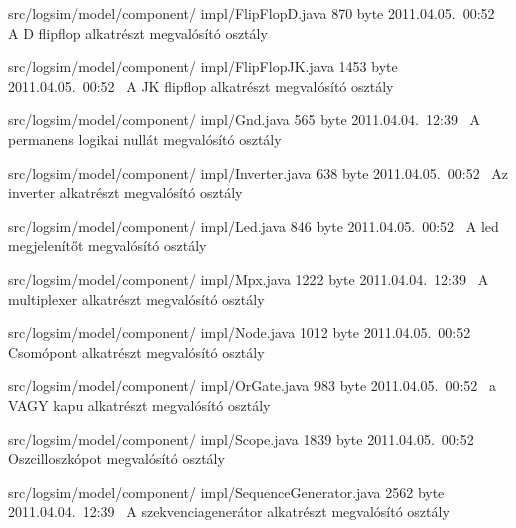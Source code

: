\begin{fajllista}
\fajl
{src/logsim/model/component/\newline
impl/FlipFlopD.java} %
{870 byte} %
{2011.04.05.~00:52~} %
{A D flipflop alkatrészt megvalósító osztály} %

\fajl
{src/logsim/model/component/\newline
impl/FlipFlopJK.java} %
{1453 byte} %
{2011.04.05.~00:52~} %
{A JK flipflop alkatrészt megvalósító osztály} %

\fajl
{src/logsim/model/component/\newline
impl/Gnd.java} %
{565 byte} %
{2011.04.04.~12:39~} %
{A permanens logikai nullát megvalósító osztály} %

\fajl
{src/logsim/model/component/\newline
impl/Inverter.java} %
{638 byte} %
{2011.04.05.~00:52~} %
{Az inverter alkatrészt megvalósító osztály} %

\fajl
{src/logsim/model/component/\newline
impl/Led.java} %
{846 byte} %
{2011.04.05.~00:52~} %
{A led megjelenítőt megvalósító osztály} %

\fajl
{src/logsim/model/component/\newline
impl/Mpx.java} %
{1222 byte} %
{2011.04.04.~12:39~} %
{A multiplexer alkatrészt megvalósító osztály} %

\fajl
{src/logsim/model/component/\newline
impl/Node.java} %
{1012 byte} %
{2011.04.05.~00:52~} %
{Csomópont alkatrészt megvalósító osztály} %

\fajl
{src/logsim/model/component/\newline
impl/OrGate.java} %
{983 byte} %
{2011.04.05.~00:52~} %
{a VAGY kapu alkatrészt megvalósító osztály} %

\fajl
{src/logsim/model/component/\newline
impl/Scope.java} %
{1839 byte} %
{2011.04.05.~00:52~} %
{Oszcilloszkópot megvalósító osztály} %

\fajl
{src/logsim/model/component/\newline
impl/SequenceGenerator.java} %
{2562 byte} %
{2011.04.04.~12:39~} %
{A szekvenciagenerátor alkatrészt megvalósító osztály} %


\end{fajllista}
